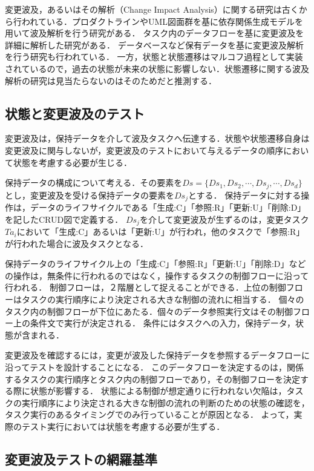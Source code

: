 \documentclass[a4paper,11pt]{jreport}
\begin{document}
変更波及，あるいはその解析（Change Impact Analysis）に関する研究は古くから行われている．プロダクトラインやUML図面群を基に依存関係生成モデルを用いて波及解析を行う研究がある\cite{gomaa2005designing,briand2003impact,小谷正行2008}．
タスク内のデータフローを基に変更波及を詳細に解析した研究がある\cite{campbell1990}．
データベースなど保有データを基に変更波及解析を行う研究も行われている\cite{maule2008impact,加藤正恭2011}．
一方，状態と状態遷移はマルコフ過程として実装されているので，過去の状態が未来の状態に影響しない．状態遷移に関する波及解析の研究は見当たらないのはそのためだと推測する．%

\subsection{状態と変更波及のテスト}
変更波及は，保持データを介して波及タスクへ伝達する．状態や状態遷移自身は変更波及に関与しないが，変更波及のテストにおいて与えるデータの順序において状態を考慮する必要が生じる．

保持データの構成について考える．その要素を$Ds=\{Ds_1,Ds_2,\cdots,Ds_j,\cdots,Ds_d\}$とし，変更波及を受ける保持データの要素を$Ds_j$とする．
保持データに対する操作は，データのライフサイクルである「生成:C」「参照:R」「更新:U」「削除:D」を記したCRUD図で定義する．
$Ds_j$を介して変更波及が生ずるのは，変更タスク$Ta_i$において「生成:C」あるいは「更新:U」が行われ，他のタスクで「参照:R」が行われた場合に波及タスクとなる．

保持データのライフサイクル上の「生成:C」「参照:R」「更新:U」「削除:D」などの操作は，無条件に行われるのではなく，操作するタスクの制御フローに沿って行われる．
制御フローは，２階層として捉えることができる．上位の制御フローはタスクの実行順序により決定される大きな制御の流れに相当する．
個々のタスク内の制御フローが下位にあたる．個々のデータ参照実行文はその制御フロー上の条件文で実行が決定される．
条件にはタスクへの入力，保持データ，状態が含まれる．

変更波及を確認するには，変更が波及した保持データを参照するデータフローに沿ってテストを設計することになる．
このデータフローを決定するのは，関係するタスクの実行順序とタスク内の制御フローであり，その制御フローを決定する際に状態が影響する．
状態による制御が想定通りに行われない欠陥は，タスクの実行順序により決定される大きな制御の流れの判断のための状態の確認を，タスク実行のあるタイミングでのみ行っていることが原因となる．%
よって，実際のテスト実行においては状態を考慮する必要が生ずる．

\subsection{変更波及テストの網羅基準}
\end{document}
